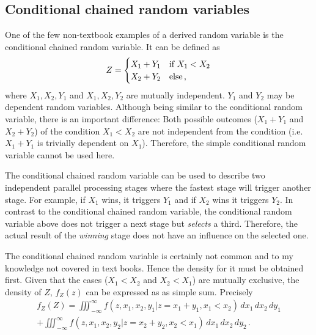 \subsection{Conditional chained random variables}
One of the few non-textbook examples of a derived random variable is the conditional chained random variable. 
It can be defined as
\begin{equation}
 Z = \begin{cases}
   X_1 + Y_1 & \mbox{if } X_1 < X_2\\
   X_2 + Y_2 & \mbox{else\,,} 
 \end{cases} \nonumber
\end{equation}
where $X_1, X_2, Y_1$ and $X_1, X_2, Y_2$ are mutually independent. $Y_1$ and $Y_2$ may be 
dependent random variables. Although being similar to the conditional random variable, there is an 
important difference: Both possible outcomes ($X_1+Y_1$ and $X_2+Y_2$) of the condition 
$X_1<X_2$ are not independent from the condition (i.e. $X_1+Y_1$ is trivially dependent on $X_1$).
Therefore, the simple conditional random variable cannot be used here. 

The conditional chained random variable can be used to describe two independent parallel processing
stages where the fastest stage will trigger another stage. For example, if $X_1$ wins, it triggers $Y_1$
and if $X_2$ wins it triggers $Y_2$. In contrast to the conditional chained random variable, the 
conditional random variable above does not trigger a next stage but \emph{selects} a third. 
Therefore, the actual result of the \emph{winning} stage does not have an influence on the 
selected one. 

The conditional chained random variable is certainly not common and to my knowledge not
covered in text books. Hence the density for it must be obtained first.
Given that the cases ($X_1<X_2$ and $X_2<X_1$) are mutually exclusive, the density of $Z$, 
$f_Z(z)$ can be expressed as as simple sum. Precisely
\begin{multline}
 f_Z(Z) = \iiint_{-\infty}^\infty f(z,x_1,x_2,y_1|z=x_1+y_1,x_1<x_2)\,dx_1\,dx_2\,dy_1 \\
  + \iiint_{-\infty}^\infty f(z,x_1,x_2,y_2|z=x_2+y_2,x_2<x_1)\,dx_1\,dx_2\,dy_2\,. \nonumber
\end{multline}

